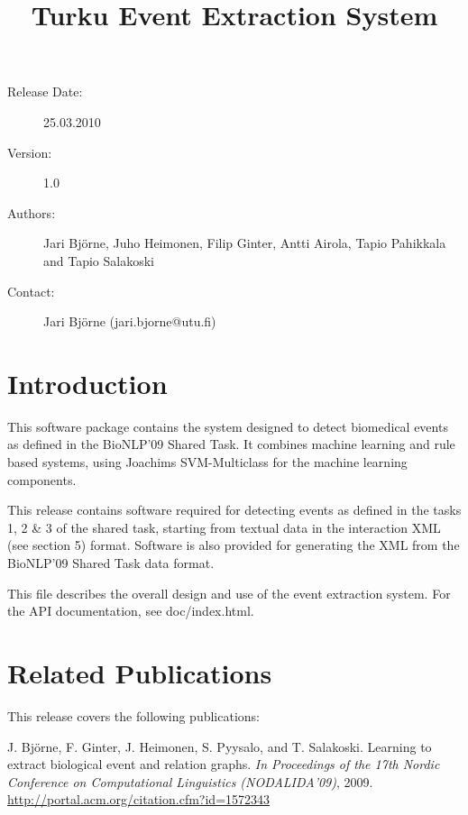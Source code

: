 \documentclass[a4paper,12pt]{article}
\title{\vspace{-4cm}Turku Event Extraction System\\}
\author{}
\date{}
\begin{document}
\maketitle

\vspace{-2cm}\begin{description}
\item[Release Date:] 25.03.2010
\item[Version:] 1.0
\item[Authors:] Jari Bj{\"{o}}rne, Juho Heimonen, Filip Ginter, Antti Airola,
Tapio Pahikkala and Tapio Salakoski
\item[Contact:] Jari Bj{\"{o}}rne (jari.bjorne@utu.fi)
\end{description}

\tableofcontents

\section{Introduction}

This software package contains the system designed to detect biomedical events as
defined in the BioNLP'09 Shared Task. It combines machine learning and rule based
systems, using Joachims SVM-Multiclass for the machine learning components.

This release contains software required for detecting events as
defined in the tasks 1, 2 \& 3 of the shared task, starting from textual data in
the interaction XML (see section 5) format. Software is also provided for
generating the XML from the BioNLP'09 Shared Task data format.

This file describes the overall design and use of the event extraction system.
For the API documentation, see doc/index.html.

\section{Related Publications}

This release covers the following publications:

\vspace{5 mm}

J. Bj{\"{o}}rne, F. Ginter, J. Heimonen, S. Pyysalo, and T. Salakoski. Learning to
extract biological event and relation graphs. \emph{In Proceedings of the 17th
Nordic Conference on Computational Linguistics (NODALIDA’09)}, 2009.
\url{http://portal.acm.org/citation.cfm?id=1572343}
\end{document}
